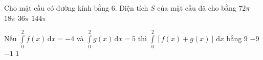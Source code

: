 \begin{ex}%
	Cho mặt cầu có đường kính bằng $6$. Diện tích $S$ của mặt cầu đã cho bằng
	\choice
	{$72\pi $}
	{$18\pi $}
	{\True $36\pi $}
	{$144\pi $}
\end{ex}

\begin{ex}%
	Nếu $\displaystyle\int\limits_0^2 f(x)\mathrm{\,d}x=-4$ và $\displaystyle\int\limits_0^2 g(x)\mathrm{\,d}x=5$ thì $\displaystyle\int\limits_0^2 \left[f(x)+g(x)\right] \mathrm{\,d}x$ bằng
	\choice
	{$9$}
	{$-9$}
	{$-1$}
	{\True $1$}
\end{ex}

